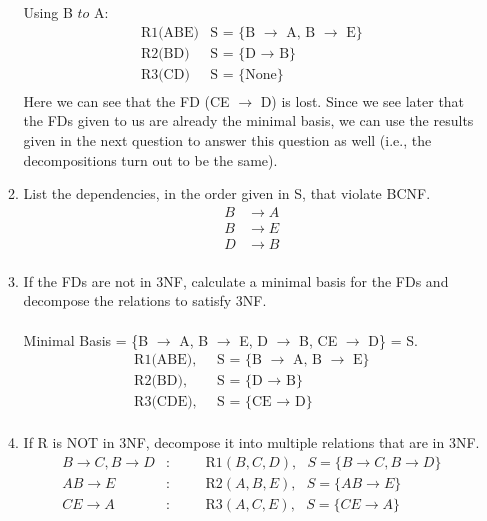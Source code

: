 \documentclass[12pt]{article}
\begin{document}
\begin{enumerate}
\begin{enumerate}
    Using B $to$ A: 
    \begin{align*}
      \text{R1(ABE)} & \text{S = \{B $\to$ A, B $\to$ E\}} \\
      \text{R2(BD)} & \text{S = \{D $\to$ B\}} \\
      \text{R3(CD)} & \text{S = \{None\}} \\
    \end{align*}
    Here we can see that the FD (CE $\to$ D) is lost. Since we see later that the FDs given to us are already the minimal basis, we can use the results given in the next question to answer this question as well (i.e., the decompositions turn out to be the same).

    \newpage

  \item List the dependencies, in the order given in S, that violate BCNF. 
    \begin{align*}
      B &\to A \\
      B &\to E \\
      D &\to B \\
    \end{align*}
  
  \item If the FDs are not in 3NF, calculate a minimal basis for the FDs and decompose the relations to satisfy 3NF. \\ \\
        Minimal Basis = \{B $\to$ A, B $\to$ E, D $\to$ B, CE $\to$ D\} = S. 
    \begin{align*}
      \text{R1(ABE), } & \text{ S = \{B $\to$ A, B $\to$ E\}} \\
      \text{R2(BD), } & \text{ S = \{D $\to$ B\}} \\
      \text{R3(CDE), } & \text{ S = \{CE $\to$ D\}} \\
    \end{align*}
  \item If R is NOT in 3NF, decompose it into multiple relations that are in 3NF.
    \begin{align*}
      B \to C, B \to D &: \hspace{1cm} \textrm{R1}(B,C,D), \textrm{  }S=\{B \to C, B \to D\} \\
      AB \to E &: \hspace{1cm} \textrm{R2}(A,B,E),\textrm{  } S=\{AB \to E\} \\
      CE \to A &: \hspace{1cm} \textrm{R3}(A,C,E), \textrm{  } S=\{CE \to A\} \\
    \end{align*}
  \end{enumerate}


\end{enumerate}
\end{document}
